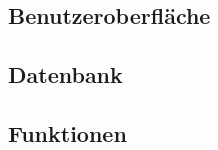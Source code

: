 \subsection{Benutzeroberfl\"ache}
\label{subsec:software:master:GUI}

\subsection{Datenbank}
\label{subsec:software:master:database}

\subsection{Funktionen}
\label{subsec:software:master:functions}
